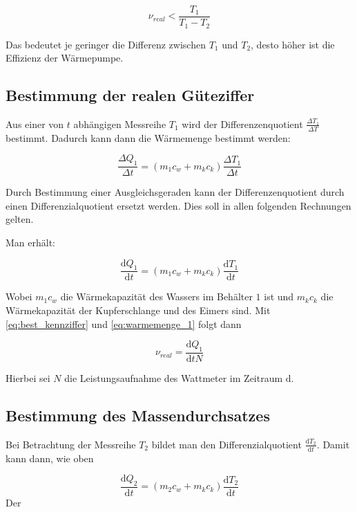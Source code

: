 \begin{equation*}
\nu_{real}<\frac{T_1}{T_1-T_2}
\end{equation*}

Das bedeutet je geringer die Differenz zwischen $T_1$ und $T_2$, 
desto höher ist die Effizienz der Wärmepumpe.

\subsection{Bestimmung der realen Güteziffer}
Aus einer von $t$ abhängigen Messreihe $T_1$ wird der Differenzenquotient $\frac{\Delta T_1}{\Delta T}$ bestimmt.
Dadurch kann dann die Wärmemenge bestimmt werden:

\begin{equation*}
\frac{\Delta Q_1}{\Delta t}=\left(m_1c_w+m_kc_k\right)\frac{\Delta T_1}{\Delta t}
\end{equation*}

Durch Bestimmung einer Ausgleichsgeraden kann der 
Differenzenquotient  durch einen Differenzialquotient
ersetzt werden.
Dies soll in allen folgenden Rechnungen gelten.

Man erhält:

\begin{equation}
\label{eq:warmemenge_1}
\frac{\mathup{d} Q_1}{\mathup{d} t}=\left(m_1c_w+m_kc_k\right)\frac{\mathup{d} T_1}{\mathup{d} t}
\end{equation}


Wobei $m_1c_w$ die Wärmekapazität des Wassers im Behälter $1$ ist und 
$m_kc_k$ die Wärmekapazität der Kupferschlange und des Eimers sind.
Mit \eqref{eq:best_kennziffer} und \eqref{eq:warmemenge_1} folgt dann

\begin{equation}
\label{eq:bestimmung_ziffer}
\nu_{real}=\frac{\mathup{d}Q_1}{\mathup{d}tN}
\end{equation}

Hierbei sei $N$ die Leistungsaufnahme des Wattmeter im Zeitraum $\mathup{d}$.

\subsection{Bestimmung des Massendurchsatzes}

Bei Betrachtung der Messreihe $T_2$ bildet man den Differenzialquotient $\frac{\mathup{d}T_2}{\mathup{d}t}$.
Damit kann dann, wie oben

\begin{equation*}
\frac{\mathup{d} Q_2}{\mathup{d} t}=\left(m_2c_w+m_kc_k\right)\frac{\mathup{d} T_2}{\mathup{d} t}
\end{equation*}Der

